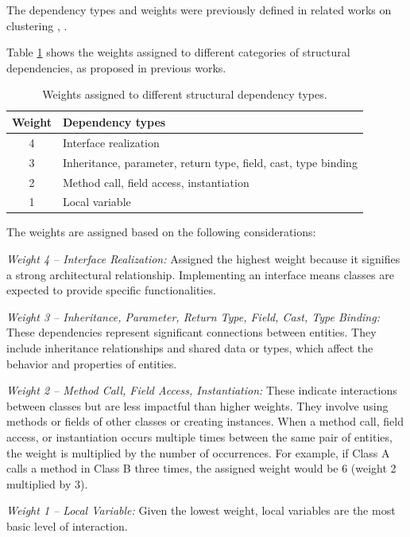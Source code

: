 \documentclass[12pt, a4paper, twoside]{report}
\begin{document}
The dependency types and weights were previously defined in related works on clustering \cite{b19}, \cite{b20}.

Table \ref{tab:structural_weights} shows the weights assigned to different categories of structural dependencies, as proposed in previous works.

\begin{table}[htbp]
\centering
\begin{tabular}{|c|l|}
\hline
\textbf{Weight} & \textbf{Dependency types} \\
\hline
4 & Interface realization \\
3 & Inheritance, parameter, return type, field, cast, type binding \\
2 & Method call, field access, instantiation \\
1 & Local variable \\
\hline
\end{tabular}
\caption{Weights assigned to different structural dependency types. \cite{b20}}
\label{tab:structural_weights}
\end{table}

The weights are assigned based on the following considerations:

\textit{Weight 4 – Interface Realization:} Assigned the highest weight because it signifies a strong architectural relationship. Implementing an interface means classes are expected to provide specific functionalities.

\textit{Weight 3 – Inheritance, Parameter, Return Type, Field, Cast, Type Binding:} These dependencies represent significant connections between entities. They include inheritance relationships and shared data or types, which affect the behavior and properties of entities.

\textit{Weight 2 – Method Call, Field Access, Instantiation:} These indicate interactions between classes but are less impactful than higher weights. They involve using methods or fields of other classes or creating instances. When a method call, field access, or instantiation occurs multiple times between the same pair of entities, the weight is multiplied by the number of occurrences. For example, if Class A calls a method in Class B three times, the assigned weight would be 6 (weight 2 multiplied by 3).

\textit{Weight 1 – Local Variable:} Given the lowest weight, local variables are the most basic level of interaction.
\end{document}
